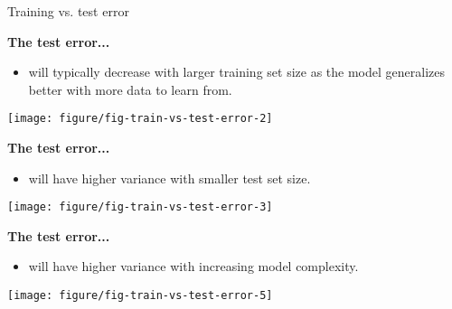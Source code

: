 \documentclass[11pt,compress,t,notes=noshow, xcolor=table]{beamer}
\begin{document}
\begin{vbframe}{Training vs. test error}
\framebreak

\textbf{The test error...}

\begin{itemize}
  \item will typically decrease with larger training set size as the model 
  generalizes better with more data to learn from.
  
\end{itemize}
\begin{center}
\texttt{[image: figure/fig-train-vs-test-error-2]}
\end{center} 

\framebreak
\textbf{The test error...}

\begin{itemize}  
  
  \item will have higher variance with smaller test set size.

\end{itemize}
\begin{center}
\texttt{[image: figure/fig-train-vs-test-error-3]}
\end{center}  

\framebreak
\textbf{The test error...}

\begin{itemize}    
  
  \item will have higher variance with increasing model complexity.
\end{itemize}

\begin{center}
\texttt{[image: figure/fig-train-vs-test-error-5]}
\end{center} 

\end{vbframe}


\end{document}
